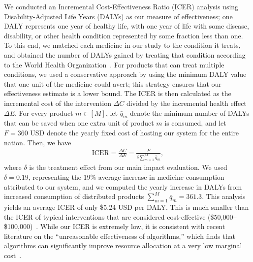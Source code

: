 \documentclass[12pt]{article}
\begin{document}
We conducted an Incremental Cost-Effectiveness Ratio (ICER) analysis using Disability-Adjusted Life Years (DALYs) as our measure of effectiveness; one DALY represents one year of healthy life, with one year of life with some disease, disability, or other health condition represented by some fraction less than one. To this end, we matched each medicine in our study to the condition it treats, and obtained the number of DALYs gained by treating that condition according to the World Health Organization~\cite{WHO_2024_GlobalHealthEstimates}. For products that can treat multiple conditions, we used a conservative approach by using the minimum DALY value that one unit of the medicine could avert; this strategy ensures that our effectiveness estimate is a lower bound. The ICER is then calculated as the incremental cost of the intervention $\Delta C$ divided by the incremental health effect $\Delta E$. For every product $m\in[M]$, let
$\bar{q}_m$ denote the minimum number of DALYs that can be saved when one extra unit of product $m$ is consumed, and let $F=\text{360 USD}$ denote the yearly fixed cost of hosting our system for the entire nation. Then, we have
\begin{align*}
\mathrm{ICER}
=
\frac{\Delta C}{\Delta E} =
\frac{F}{\delta\sum_{m=1}^M\bar{q}_m},
\end{align*}
where $\delta$ is the treatment effect from our main impact evaluation. We used $\delta = 0.19$, representing the 19\% average increase in medicine consumption attributed to our system, and we computed the yearly increase in DALYs from increased consumption of distributed products $\sum_{m=1}^M\bar{q}_m=361.3$. This analysis yields an average ICER of only \$5.24 USD per DALY. This is much smaller than the ICER of typical interventions that are considered cost-effective
(\$50{,}000--\$100{,}000)~\cite{ICER2019ThresholdRanges,HERC_CEA,neumann2014updating}. While our ICER is extremely low, it is consistent with recent literature on the ``unreasonable effectiveness of algorithms,'' which finds that algorithms can significantly improve resource allocation at a very low marginal cost~\cite{ludwig2024unreasonable}.
\end{document}

